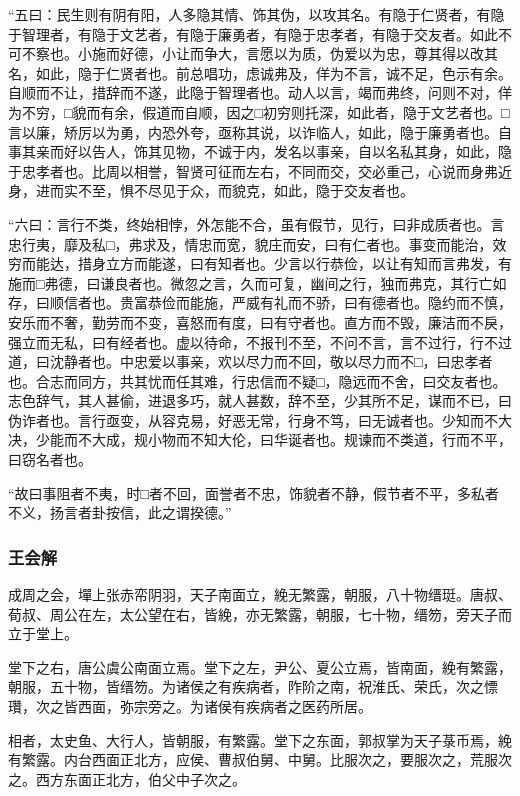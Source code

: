 \documentclass[]{article}
\begin{document}
``五曰：民生则有阴有阳，人多隐其情、饰其伪，以攻其名。有隐于仁贤者，有隐于智理者，有隐于文艺者，有隐于廉勇者，有隐于忠孝者，有隐于交友者。如此不可不察也。小施而好德，小让而争大，言愿以为质，伪爱以为忠，尊其得以改其名，如此，隐于仁贤者也。前总唱功，虑诚弗及，佯为不言，诚不足，色示有余。自顺而不让，措辞而不遂，此隐于智理者也。动人以言，竭而弗终，问则不对，佯为不穷，□貌而有余，假道而自顺，因之□初穷则托深，如此者，隐于文艺者也。□言以廉，矫厉以为勇，内恐外夸，亟称其说，以诈临人，如此，隐于廉勇者也。自事其亲而好以告人，饰其见物，不诚于内，发名以事亲，自以名私其身，如此，隐于忠孝者也。比周以相誉，智贤可征而左右，不同而交，交必重己，心说而身弗近身，进而实不至，惧不尽见于众，而貌克，如此，隐于交友者也。

``六曰：言行不类，终始相悖，外怎能不合，虽有假节，见行，曰非成质者也。言忠行夷，靡及私□，弗求及，情忠而宽，貌庄而安，曰有仁者也。事变而能治，效穷而能达，措身立方而能遂，曰有知者也。少言以行恭俭，以让有知而言弗发，有施而□弗德，曰谦良者也。微忽之言，久而可复，幽间之行，独而弗克，其行亡如存，曰顺信者也。贵富恭俭而能施，严威有礼而不骄，曰有德者也。隐约而不慎，安乐而不奢，勤劳而不变，喜怒而有度，曰有守者也。直方而不毁，廉洁而不戾，强立而无私，曰有经者也。虚以待命，不报刊不至，不问不言，言不过行，行不过道，曰沈静者也。中忠爱以事亲，欢以尽力而不回，敬以尽力而不□，曰忠孝者也。合志而同方，共其忧而任其难，行忠信而不疑□，隐远而不舍，曰交友者也。志色辞气，其人甚偷，进退多巧，就人甚数，辞不至，少其所不足，谋而不已，曰伪诈者也。言行亟变，从容克易，好恶无常，行身不笃，曰无诚者也。少知而不大决，少能而不大成，规小物而不知大伦，曰华诞者也。规谏而不类道，行而不平，曰窃名者也。

``故曰事阻者不夷，时□者不回，面誉者不忠，饰貌者不静，假节者不平，多私者不义，扬言者卦按信，此之谓揆德。''

\hypertarget{header-n315}{%
\subsubsection{王会解}\label{header-n315}}

成周之会，墠上张赤帟阴羽，天子南面立，絻无繁露，朝服，八十物缙珽。唐叔、荀叔、周公在左，太公望在右，皆絻，亦无繁露，朝服，七十物，缙笏，旁天子而立于堂上。

堂下之右，唐公虞公南面立焉。堂下之左，尹公、夏公立焉，皆南面，絻有繁露，朝服，五十物，皆缙笏。为诸侯之有疾病者，阼阶之南，祝淮氏、荣氏，次之慓瓚，次之皆西面，弥宗旁之。为诸侯有疾病者之医药所居。

相者，太史鱼、大行人，皆朝服，有繁露。堂下之东面，郭叔掌为天子菉币焉，絻有繁露。内台西面正北方，应侯、曹叔伯舅、中舅。比服次之，要服次之，荒服次之。西方东面正北方，伯父中子次之。
\end{document}
